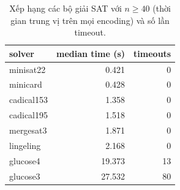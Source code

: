 \begin{table}[t]
\centering
\caption{Xếp hạng các bộ giải SAT với $n \geq 40$ (thời gian trung vị trên mọi encoding) và số lần timeout.}
\label{tab:solver_rank}
\begin{tabular}{lrr}
\toprule
solver & median time (s) & timeouts \\
\midrule
minisat22 & 0.421 & 0 \\
minicard & 0.428 & 0 \\
cadical153 & 1.358 & 0 \\
cadical195 & 1.518 & 0 \\
mergesat3 & 1.871 & 0 \\
lingeling & 2.168 & 0 \\
glucose4 & 19.373 & 13 \\
glucose3 & 27.532 & 80 \\
\bottomrule
\end{tabular}
\end{table}
